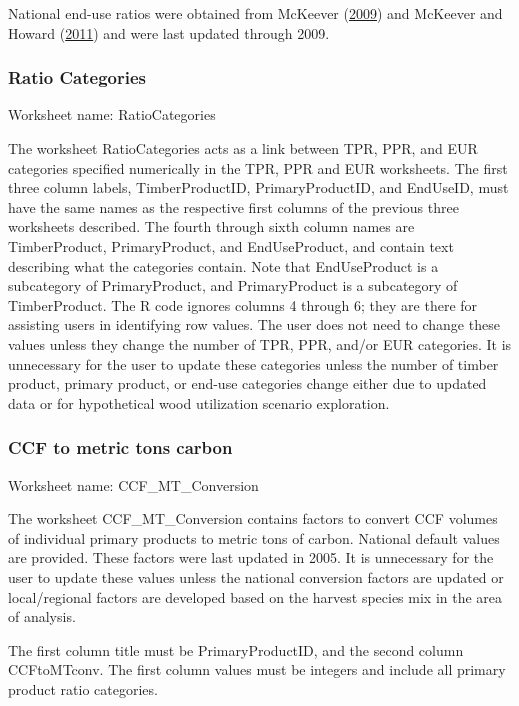 \documentclass[
  openany]{book}
\begin{document}
National end-use ratios were obtained from McKeever
(\protect\hyperlink{ref-mckeever2009}{2009}) and McKeever and Howard
(\protect\hyperlink{ref-mckeever2011}{2011}) and were last updated
through 2009.

\hypertarget{own-prov-input-rc}{%
\subsubsection{Ratio Categories}\label{own-prov-input-rc}}

Worksheet name: RatioCategories

The worksheet RatioCategories acts as a link between TPR, PPR, and EUR
categories specified numerically in the TPR, PPR and EUR worksheets. The
first three column labels, TimberProductID, PrimaryProductID, and
EndUseID, must have the same names as the respective first columns of
the previous three worksheets described. The fourth through sixth column
names are TimberProduct, PrimaryProduct, and EndUseProduct, and contain
text describing what the categories contain. Note that EndUseProduct is
a subcategory of PrimaryProduct, and PrimaryProduct is a subcategory of
TimberProduct. The R code ignores columns 4 through 6; they are there
for assisting users in identifying row values. The user does not need to
change these values unless they change the number of TPR, PPR, and/or
EUR categories. It is unnecessary for the user to update these
categories unless the number of timber product, primary product, or
end-use categories change either due to updated data or for hypothetical
wood utilization scenario exploration.

\hypertarget{own-prov-input-ccfMTC}{%
\subsubsection{CCF to metric tons carbon}\label{own-prov-input-ccfMTC}}

Worksheet name: CCF\_MT\_Conversion

The worksheet CCF\_MT\_Conversion contains factors to convert CCF
volumes of individual primary products to metric tons of carbon.
National default values are provided. These factors were last updated in
2005. It is unnecessary for the user to update these values unless the
national conversion factors are updated or local/regional factors are
developed based on the harvest species mix in the area of analysis.

The first column title must be PrimaryProductID, and the second column
CCFtoMTconv. The first column values must be integers and include all
primary product ratio categories.
\end{document}

